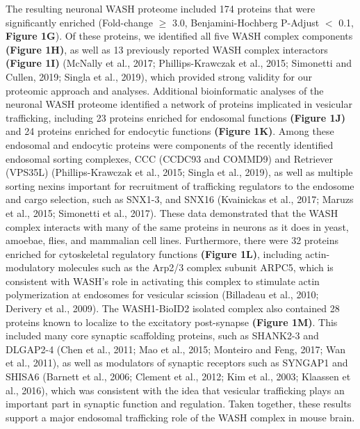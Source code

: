
The resulting neuronal WASH proteome included 174 proteins that were
significantly enriched (Fold-change $\geq$ 3.0, Benjamini-Hochberg P-Adjust $<$ 0.1,
\textbf{Figure 1G}). Of these proteins, we identified all five WASH complex components
\textbf{(Figure 1H)}, as well as 13 previously reported WASH complex interactors 
\textbf{(Figure 1I)} (McNally et al., 2017; Phillips-Krawczak et al., 2015; Simonetti and
Cullen, 2019; Singla et al., 2019), which provided strong validity for our
proteomic approach and analyses. Additional bioinformatic analyses of the
neuronal WASH proteome identified a network of proteins implicated in vesicular
trafficking, including 23 proteins enriched for endosomal functions \textbf{(Figure 1J)}
and 24 proteins enriched for endocytic functions \textbf{(Figure 1K)}. Among these
endosomal and endocytic proteins were components of the recently identified
endosomal sorting complexes, CCC (CCDC93 and COMMD9) and Retriever (VPS35L)
(Phillips-Krawczak et al., 2015; Singla et al., 2019), as well as multiple
sorting nexins important for recruitment of trafficking regulators to the
endosome and cargo selection, such as SNX1-3, and SNX16 (Kvainickas et al.,
2017; Maruzs et al., 2015; Simonetti et al., 2017). These data demonstrated that
the WASH complex interacts with many of the same proteins in neurons as it does
in yeast, amoebae, flies, and mammalian cell lines. Furthermore, there were 32
proteins enriched for cytoskeletal regulatory functions \textbf{(Figure 1L)}, including
actin-modulatory molecules such as the Arp2/3 complex subunit ARPC5, which is
consistent with WASH’s role in activating this complex to stimulate actin
polymerization at endosomes for vesicular scission (Billadeau et al., 2010;
Derivery et al., 2009). The WASH1-BioID2 isolated complex also contained 28
proteins known to localize to the excitatory post-synapse \textbf{(Figure 1M)}. This
included many core synaptic scaffolding proteins, such as SHANK2-3 and DLGAP2-4
(Chen et al., 2011; Mao et al., 2015; Monteiro and Feng, 2017; Wan et al.,
2011), as well as modulators of synaptic receptors such as SYNGAP1 and SHISA6
(Barnett et al., 2006; Clement et al., 2012; Kim et al., 2003; Klaassen et al.,
2016), which was consistent with the idea that vesicular trafficking plays an
important part in synaptic function and regulation. Taken together, these
results support a major endosomal trafficking role of the WASH complex in mouse
brain. 


